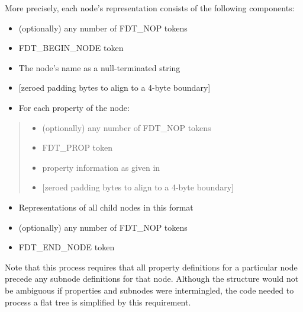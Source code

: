 \documentclass[a4paper,10pt,oneside]{sphinxmanual}
\begin{document}
More precisely, each node’s representation consists of the following
components:
\begin{itemize}
\item {} 
(optionally) any number of FDT\_NOP tokens

\item {} 
FDT\_BEGIN\_NODE token

\end{itemize}
\begin{itemize}
\item {} 
The node’s name as a null-terminated string

\item {} 
{[}zeroed padding bytes to align to a 4-byte boundary{]}

\end{itemize}
\begin{itemize}
\item {} 
For each property of the node:

\end{itemize}
\begin{quote}
\begin{itemize}
\item {} 
(optionally) any number of FDT\_NOP tokens

\item {} 
FDT\_PROP token

\end{itemize}
\begin{itemize}
\item {} 
property information as given in {\hyperref[flattened\string-format:sect\string-fdt\string-lexical\string-structure]{}}

\item {} 
{[}zeroed padding bytes to align to a 4-byte boundary{]}

\end{itemize}
\end{quote}
\begin{itemize}
\item {} 
Representations of all child nodes in this format

\item {} 
(optionally) any number of FDT\_NOP tokens

\item {} 
FDT\_END\_NODE token

\end{itemize}

Note that this process requires that all property definitions for a
particular node precede any subnode definitions for that node. Although
the structure would not be ambiguous if properties and subnodes were
intermingled, the code needed to process a flat tree is simplified by
this requirement.
\end{document}
